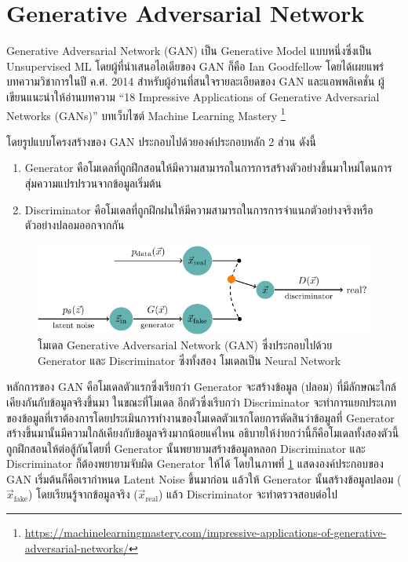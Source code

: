 \section{Generative Adversarial Network}
\label{sec:gan}

Generative Adversarial Network (GAN) เป็น Generative Model แบบหนึ่งซึ่งเป็น Unsupervised ML โดยผู้ที่นำเสนอไอเดียของ GAN 
ก็คือ Ian Goodfellow โดยได้เผยแพร่บทความวิชาการในปี ค.ศ. 2014\autocite{goodfellow2014b} สำหรับผู้อ่านที่สนใจรายละเอียดของ 
GAN และแอพพลิเคชั่น ผู้เขียนแนะนำให้อ่านบทความ \enquote{18 Impressive Applications of Generative Adversarial Networks 
(GANs)} บทเว็บไซต์ Machine Learning Mastery%
\footnote{\url{https://machinelearningmastery.com/impressive-applications-of-generative-adversarial-networks/}}

\noindent โดยรูปแบบโครงสร้างของ GAN ประกอบไปด้วยองค์ประกอบหลัก 2 ส่วน ดังนี้

\begin{enumerate}
    \item Generator คือโมเดลที่ถูกฝึกสอนให้มีความสามารถในการการสร้างตัวอย่างขึ้นมาใหม่โดนการสุ่มความแปรปรวนจากข้อมูลเริ่มต้น
    \item Discriminator คือโมเดลที่ถูกฝึกฝนให้มีความสามารถในการการจำแนกตัวอย่างจริงหรือตัวอย่างปลอมออกจากกัน
\end{enumerate}

\begin{figure}[htbp]
    \includegraphics[width=\linewidth]{fig/generative_adversarial_nets.pdf}
    \caption{โมเดล Generative Adversarial Network (GAN) ซึ่งประกอบไปด้วย Generator และ Discriminator ซึ่งทั้งสอง%
    โมเดลเป็น Neural Network}
    \label{fig:gan}
\end{figure}

หลักการของ GAN คือโมเดลตัวแรกซึ่งเรียกว่า Generator จะสร้างข้อมูล (ปลอม) ที่มีลักษณะใกล้เคียงกันกับข้อมูลจริงขึ้นมา ในขณะที่โมเดล%
อีกตัวซึ่งเรีบกว่า Discriminator จะทำการแยกประเภทของข้อมูลที่เราต้องการโดยประเมินการทำงานของโมเดลตัวแรกโดยการตัดสินว่าข้อมูลที่ 
Generator สร้างขึ้นมานั้นมีความใกล้เคียงกับข้อมูลจริงมากน้อยแค่ไหน อธิบายให้ง่ายกว่านี้ก็คือโมเดลทั้งสองตัวนี้ถูกฝึกสอนให้ต่อสู้กันโดยที่
Generator นั้นพยายามสร้างข้อมูลหลอก Discriminator และ Discriminator ก็ต้องพยายามจับผิด Generator ให้ได้ โดยในภาพที่ 
\ref{fig:gan} แสดงองค์ประกอบของ GAN เริ่มต้นก็คือเรากำหนด Latent Noise ขึ้นมาก่อน แล้วให้ Generator นั้นสร้างข้อมูลปลอม 
($\vec{x}_{\text{fake}}$) โดยเรียนรู้จากข้อมูลจริง ($\vec{x}_{\text{real}}$) แล้ว Discriminator จะทำตรวจสอบต่อไป

